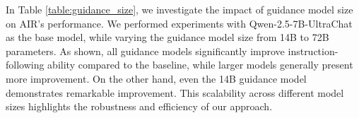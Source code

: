 \begin{table}[!ht]
\centering
\renewcommand{\arraystretch}{0.95}
\caption{Experiment results on Qwen-2.5-7B-UltraChat fine-tuned with different guidance model size.}
\label{table:guidance_size}
\end{table}

In Table \ref{table:guidance_size}, we investigate the impact of guidance model size on AIR's performance. We performed experiments with Qwen-2.5-7B-UltraChat as the base model, while varying the guidance model size from 14B to 72B parameters. As shown, all guidance models significantly improve instruction-following ability compared to the baseline, while larger models generally present more improvement. On the other hand, even the 14B guidance model demonstrates remarkable improvement. This scalability across different model sizes highlights the robustness and efficiency of our approach.




